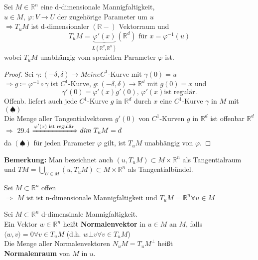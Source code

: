 \begin{sa}
Sei $M \in \mathbb{R}^n $ eine d-dimensionale Mannigfaltigkeit, \\
$u \in M $, $ \varphi : V \rightarrow U $ der zugehörige Parameter um $u$ \\
$\Longrightarrow T_uM $ ist d-dimensionaler $( \mathbb{R}-) $ Vektorraum und \\
    \begin{equation}
    T_uM = \underbrace{\varphi'(x)}_{L \left( \mathbb{R}^d, \mathbb{R}^n \right) }
    \left( \mathbb{R}^d \right) \text{ für } x = \varphi^{-1} (u) 
    \end{equation}
wobei $T_uM$ unabhängig vom speziellen Parameter $\varphi$ ist.
\end{sa}

\begin{proof}
Sei $\gamma: (-\delta, \delta) \rightarrow M eine C^1$-Kurve mit $\gamma(0) = u $ \\
$\Rightarrow g \coloneqq \varphi^{-1} \circ \gamma $ ist $C^1$-Kurve, 
$g: (-\delta, \delta) \rightarrow \mathbb{R}^d $ mit $ g(0) = x $ und
    \begin{equation*}
    \gamma' (0) = \varphi' (x) g'(0) \text{, } \varphi' (x) \text{ist regulär.}
    \tag{$\spadesuit$}
    \end{equation*}
Offenb. liefert auch jede $C^1$-Kurve $g$ in $\mathbb{R}^d $ durch $x$
eine $C^1$-Kurve $\gamma$ in $M$ mit $(\spadesuit)$ \\
Die Menge aller Tangentialvektoren $g'(0)$ von $C^1$-Kurven $g$ in $\mathbb{R}^d $
ist offenbar $\mathbb{R}^d $ \\
$\Rightarrow $ 
29.4 $ \xRightarrow{\varphi' (x) \text{ ist regulär}} \textit{dim } T_uM = d $ \\
da $(\spadesuit)$ für jeden Parameter $\varphi$ gilt, ist $T_uM$ unabhängig von $\varphi$.
\end{proof}

\textbf{Bemerkung:}
Man bezeichnet auch $(u, T_uM) \subset M \times \mathbb{R}^n$
als Tangentialraum und
$TM = \bigcup\limits_{U \in M} (u, T_uM) \subset M \times \mathbb{R}^n $
als Tangentialbündel.

\begin{beispiel}
Sei $M \subset \mathbb{R}^n $ offen  \\
$\Rightarrow $ $M$ ist ist n-dimensionale Mannigfaltigkeit und 
$T_uM = \mathbb{R}^n \forall u \in M $
\end{beispiel}

\begin{definition}
Sei $M \subset \mathbb{R}^n $ d-dimensinale Mannigfaltigkeit. \\
Ein Vektor $w \in \mathbb{R}^n $ heißt \textbf{Normalenvektor} in $u \in M $ an $M$, falls\\
$\langle w,v \rangle = 0 \forall v \in T_uM $
(d.h. $w \bot v \forall v \in T_uM$) \\
Die Menge aller Normalenvektoren $N_uM = T_uM^{\bot} $ heißt \\
\textbf{Normalenraum} von $M$ in $u$. 
\end{definition}